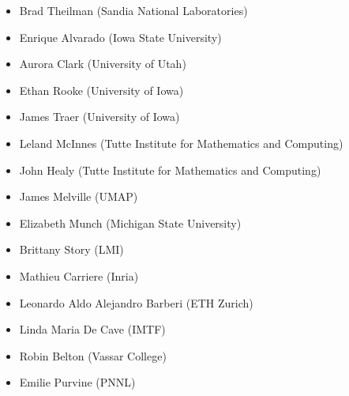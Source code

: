 \begin{itemize}
    \item Brad Theilman (Sandia National Laboratories)
    \item Enrique Alvarado (Iowa State University)
    \item Aurora Clark (University of Utah)
    \item Ethan Rooke (University of Iowa)
    \item James Traer (University of Iowa)
    \item Leland McInnes (Tutte Institute for Mathematics and Computing)
    \item John Healy (Tutte Institute for Mathematics and Computing)
    \item James Melville (UMAP)
    \item Elizabeth Munch (Michigan State University)
    \item Brittany Story (LMI)
    \item Mathieu Carriere (Inria)
    \item Leonardo Aldo Alejandro Barberi (ETH Zurich)
    \item Linda Maria De Cave (IMTF)
    \item Robin Belton (Vassar College)
    \item Emilie Purvine (PNNL)
\end{itemize}